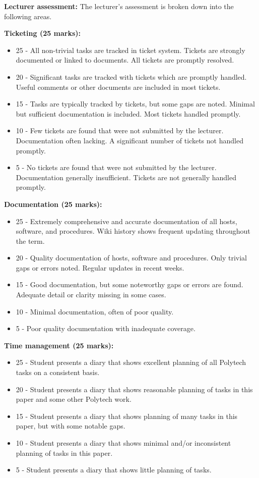 \documentclass{article}   	%
\begin{document}
\vskip 5mm

\textbf{Lecturer assessment:} The lecturer's assessment is broken down into the following areas.

\textbf{Ticketing (25 marks):}
\begin{itemize}
  \item 25 - All non-trivial tasks are tracked in ticket system. Tickets are strongly documented or linked to documents.  All tickets are promptly resolved.
  \item 20 - Significant tasks are tracked with tickets which are promptly handled.  Useful comments or other documents are included in most tickets.
  \item 15 - Tasks are typically tracked by tickets, but some gaps are noted.  Minimal but sufficient documentation is included.  Most tickets handled promptly.
  \item 10 - Few tickets are found that were not submitted by the lecturer.  Documentation often lacking.  A significant number of tickets not handled promptly.
  \item 5 - No tickets are found that were not submitted by the lecturer.  Documentation generally insufficient.  Tickets are not generally handled promptly.
\end{itemize}

\newpage

\textbf{Documentation (25 marks):}
\begin{itemize}
  \item 25 - Extremely comprehensive and accurate documentation of all hosts, software, and procedures.  Wiki history shows frequent updating throughout the term.
  \item 20 - Quality documentation of hosts, software and procedures.  Only trivial gaps or errors noted.   Regular updates in recent weeks.
  \item 15 - Good documentation, but some noteworthy gaps or errors are found.  Adequate detail or clarity missing in some cases.
  \item 10 - Minimal documentation, often of poor quality.
  \item 5 -  Poor quality documentation with inadequate coverage.
\end{itemize}

\textbf{Time management (25 marks):}
\begin{itemize}
  \item 25 - Student presents a diary that shows excellent planning of all Polytech tasks on a consistent basis.
  \item 20 - Student presents a diary that shows reasonable planning of tasks in this paper and some other Polytech work.
  \item 15 - Student presents a diary that shows planning of many tasks in this paper, but with some notable gaps.
  \item 10 - Student presents a diary that shows minimal and/or inconsistent planning of tasks in this paper.
  \item 5 -  Student presents a diary that shows little planning of tasks.
\end{itemize}
\end{document}
